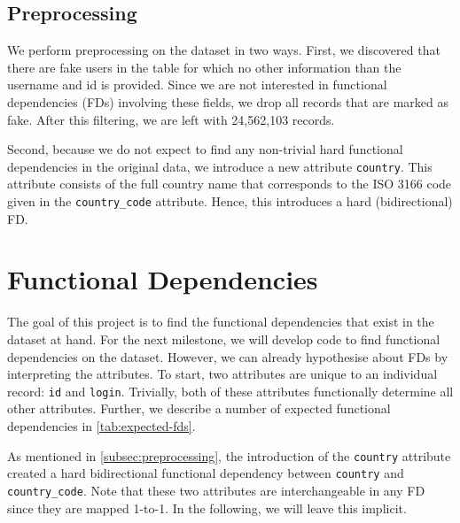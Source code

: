 \documentclass{article}
\begin{document}
    \subsection{Preprocessing}
    \label{subsec:preprocessing}
    We perform preprocessing on the dataset in two ways. First, we discovered that there are fake users in the table for which no other information than the username and id is provided. Since we are not interested in functional dependencies (FDs) involving these fields, we drop all records that are marked as fake. After this filtering, we are left with 24,562,103 records.
    
    Second, because we do not expect to find any non-trivial hard functional dependencies in the original data, we introduce a new attribute \texttt{country}. This attribute consists of the full country name that corresponds to the ISO 3166 code given in the \texttt{country\_code} attribute. Hence, this introduces a hard (bidirectional) FD.

\section{Functional Dependencies}\label{sec:fd}
    
    The goal of this project is to find the functional dependencies that exist in the dataset at hand. For the next milestone, we will develop code to find functional dependencies on the dataset. However, we can already hypothesise about FDs by interpreting the attributes. To start, two attributes are unique to an individual record: \texttt{id} and \texttt{login}. Trivially, both of these attributes functionally determine all other attributes. Further, we describe a number of expected functional dependencies in \autoref{tab:expected-fds}.

    As mentioned in \autoref{subsec:preprocessing}, the introduction of the \texttt{country} attribute created a hard bidirectional functional dependency between \texttt{country} and \texttt{country\_code}. Note that these two attributes are interchangeable in any FD since they are mapped 1-to-1. In the following, we will leave this implicit.
    
\end{document}
